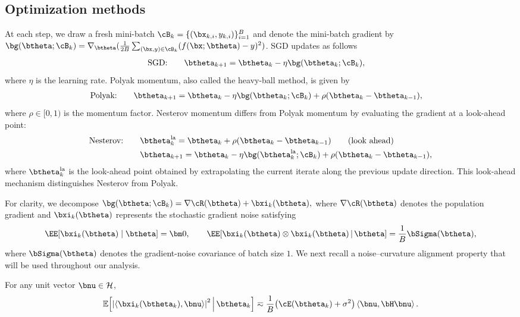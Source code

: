 \documentclass[11pt]{article}
\newcommand{\la}{\mathrm{la}}
\begin{document}
\subsection{Optimization methods}
\label{sec:err recursion}
At each step, we draw a fresh mini-batch $\cB_k =\{(\bx_{k,i}, y_{k,i})\}_{i=1}^{B}$ and denote the  mini-batch gradient by $\bg(\btheta;\cB_k) = \nabla_{\btheta}(\tfrac{1}{2B}\sum_{(\bx,y)\in\cB_k}(f(\bx;\btheta)-y)^2)$. SGD updates as follows
\begin{align}
\textnormal{SGD:}&\qquad
\btheta_{k+1}
=
\btheta_k-\eta \bg(\btheta_k;\cB_k),
\label{eq:sgd-update}
\end{align}
where $\eta$ is the learning rate. Polyak momentum, also called the heavy-ball method, is given by 
\begin{align}
\textnormal{Polyak:}&\qquad
\btheta_{k+1}
=
\btheta_k
-\eta\bg(\btheta_k;\cB_k)+\rho(\btheta_k-\btheta_{k-1}),
\label{eq:hb-update}
\end{align}
where $\rho\in [0,1)$ is the momentum factor. Nesterov momentum differs from Polyak momentum by evaluating the gradient at a look-ahead point:
\begin{align}
\notag \textnormal{Nesterov:}&\qquad\btheta_k^{\la}=\btheta_k+\rho(\btheta_k-\btheta_{k-1})\qquad \text{(look ahead)}\\
&\qquad \btheta_{k+1}=\btheta_k -\eta\bg(\btheta_k^{\la};\cB_k)+\rho(\btheta_k-\btheta_{k-1}),
\label{eq:nag-update}
\end{align}
where 
\(\btheta_k^{\la}\) is the look-ahead point obtained by extrapolating the current iterate along the previous update direction. This look-ahead mechanism distinguishes Nesterov from Polyak.


For clarity, we decompose  \(
\bg(\btheta;\cB_k)
=
\nabla\cR(\btheta)+\bxi_k(\btheta),
\)
where \(\nabla\cR(\btheta)\) denotes the population gradient and \(\bxi_k(\btheta)\) represents  the stochastic gradient noise satisfying
\[
\EE[\bxi_k(\btheta)\mid\btheta]=\bm 0,
\qquad
\EE\!\left[
\bxi_k(\btheta)\otimes\bxi_k(\btheta)
\,\middle|\,\btheta
\right]
=
\frac{1}{B}\bSigma(\btheta),
\]
where \(\bSigma(\btheta)\) denotes the gradient-noise covariance of batch size \(1\). We next recall a noise--curvature alignment property that will be used
throughout our analysis.

\begin{proposition}
\label{prop:noise-geometry}
For any unit vector \(\bnu\in\mathcal H\),
\begin{equation}
\label{eqn:noise-geometry}
\mathbb E\!\left[
\left|
\left\langle\bxi_k(\btheta_k),\bnu\right\rangle
\right|^2
\,\middle|\,
\btheta_k
\right]
\eqsim
\frac{1}{B}
\bigl(\cE(\btheta_k)+\sigma^2\bigr)
\left\langle\bnu,\bH\bnu\right\rangle.
\end{equation}
\end{proposition}
\end{document}
